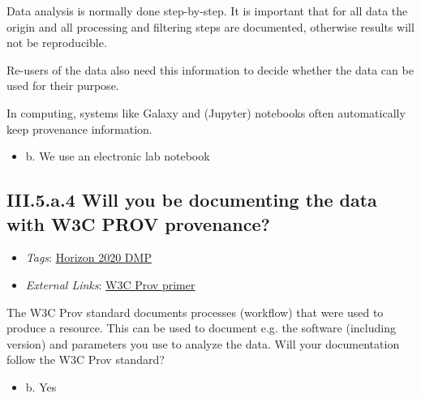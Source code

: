 \documentclass[a4paper,12pt]{report}
\begin{document}
\noindent
\begin{markdown}
Data analysis is normally done step-by-step.  It is important that for all data the origin and all processing and filtering steps are documented, otherwise results will not be reproducible. 

Re-users of the data also need this information to decide whether the data can be used for their purpose.

In computing, systems like Galaxy and (Jupyter) notebooks often automatically keep provenance information.
\end{markdown}



\begin{itemize}
  \item[\CheckmarkBold] b. We use an electronic lab notebook
\end{itemize}




\subsection*{\protect\textcolor{colorSecId}{III.5.a.4} Will you be documenting the data with W3C PROV provenance?}

\label{b1df3c74-0b1f-4574-81c4-4cc2d780c1af.8c962e6f-17ee-4b22-8ebb-9f06f779e3b3.6d18bfff-0f53-469b-934e-9806dda9d4fb.106df534-f590-416b-8e4a-846edbdc4325}


\begin{itemize}
  \item \textit{Tags}: \ul{Horizon 2020 DMP}
  
  \item \textit{External Links}: \href{https://www.w3.org/TR/prov-primer/}{W3C Prov primer}\end{itemize}


\noindent
\begin{markdown}
The W3C Prov standard documents processes (workflow) that were used to produce a resource. This can be used to document e.g. the software (including version) and parameters you use to analyze the data. Will your documentation follow the W3C Prov standard?
\end{markdown}



\begin{itemize}
  \item[\CheckmarkBold] b. Yes
\end{itemize}
\end{document}
